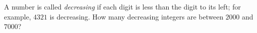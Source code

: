 A number is called \emph{decreasing} if each digit is less than the digit to its left; for example, $4321$ is decreasing. How many decreasing integers are between $2000$ and $7000$?
